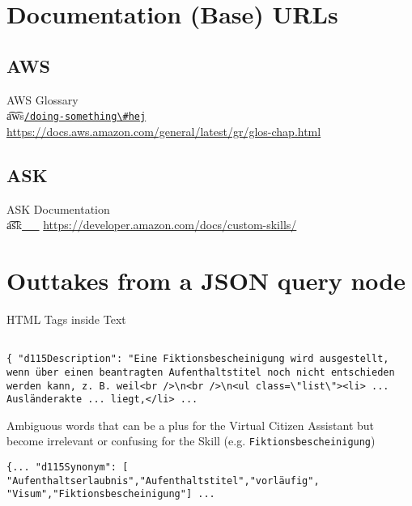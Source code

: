 \section*{Documentation (Base) URLs}

\subsection*{AWS}
AWS Glossary\\ \t{a\t{ws}}\href{www.apple.com}{\lstinline|/doing-something\#hej|}
\url{https://docs.aws.amazon.com/general/latest/gr/glos-chap.html}

\subsection*{ASK}

ASK Documentation\\ \t{a\t{sk}}\href{   }{\lstinline|   |}
\url{https://developer.amazon.com/docs/custom-skills/}





\clearpage

\section*{Outtakes from a JSON query node}
\label{query:dl}

HTML Tags inside Text
\begin{verbatim}

{ "d115Description": "Eine Fiktionsbescheinigung wird ausgestellt, wenn über einen beantragten Aufenthaltstitel noch nicht entschieden werden kann, z. B. weil<br />\n<br />\n<ul class=\"list\"><li> ... Ausländerakte ... liegt,</li> ...
\end{verbatim}

Ambiguous words that can be a plus for the Virtual Citizen Assistant but become irrelevant or confusing for the Skill (e.g. \texttt{Fiktionsbescheinigung})
\begin{verbatim}
{... "d115Synonym": [
"Aufenthaltserlaubnis","Aufenthaltstitel","vorläufig",
"Visum","Fiktionsbescheinigung"] ...
\end{verbatim}

